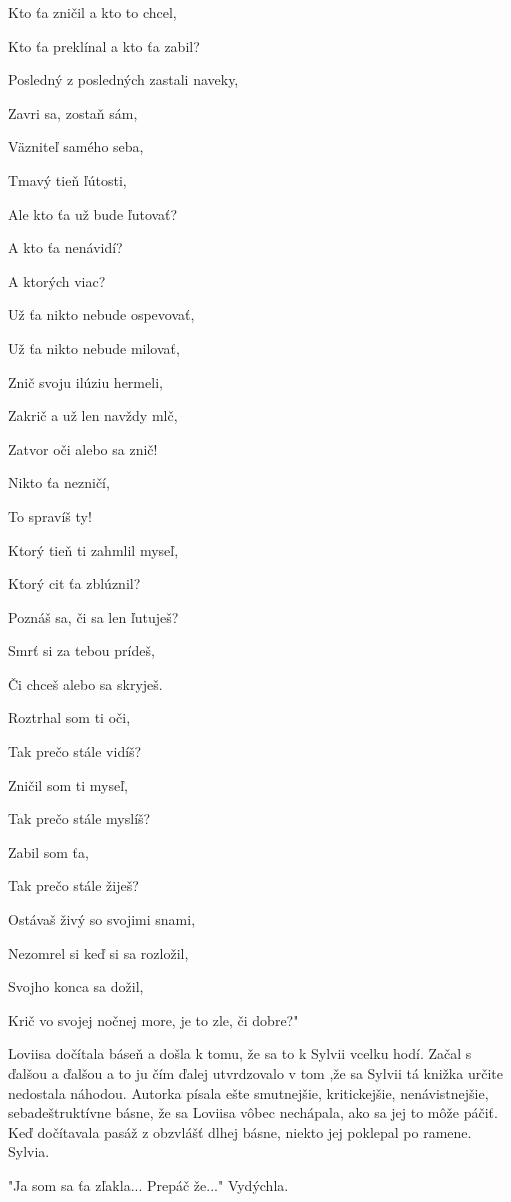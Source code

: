 \documentclass{book}
\begin{document}
Kto ťa zničil a kto to chcel,

Kto ťa preklínal a kto ťa zabil?

Posledný z posledných zastali naveky,

Zavri sa, zostaň sám,

Väzniteľ samého seba,

Tmavý tieň ľútosti,

Ale kto ťa už bude ľutovať?

A kto ťa nenávidí?

A ktorých viac?

Už ťa nikto nebude ospevovať,

Už ťa nikto nebude milovať,

Znič svoju ilúziu hermeli,

Zakrič a už len navždy mlč,

Zatvor oči alebo sa znič!

Nikto ťa nezničí,

To spravíš ty!

Ktorý tieň ti zahmlil myseľ,

Ktorý cit ťa zblúznil?

Poznáš sa, či sa len ľutuješ?

Smrť si za tebou prídeš,

Či chceš alebo sa skryješ.

Roztrhal som ti oči,

Tak prečo stále vidíš?

Zničil som ti myseľ,

Tak prečo stále myslíš?

Zabil som ťa,

Tak prečo stále žiješ?

Ostávaš živý so svojimi snami,

Nezomrel si keď si sa rozložil,

Svojho konca sa dožil,

Krič vo svojej nočnej more, je to zle, či dobre?"$ $ 

Loviisa dočítala báseň a došla k tomu, že sa to k Sylvii vcelku hodí. Začal s ďalšou a ďalšou a to ju čím ďalej utvrdzovalo v tom ,že sa Sylvii tá knižka určite nedostala náhodou. Autorka písala ešte smutnejšie, kritickejšie, nenávistnejšie, sebadeštruktívne básne, že sa Loviisa vôbec nechápala, ako sa jej to môže páčiť. Keď dočítavala pasáž z obzvlášť dlhej básne, niekto jej poklepal po ramene. Sylvia.

"$ $Ja som sa ťa zľakla... Prepáč že..."$ $  Vydýchla.
\end{document}
